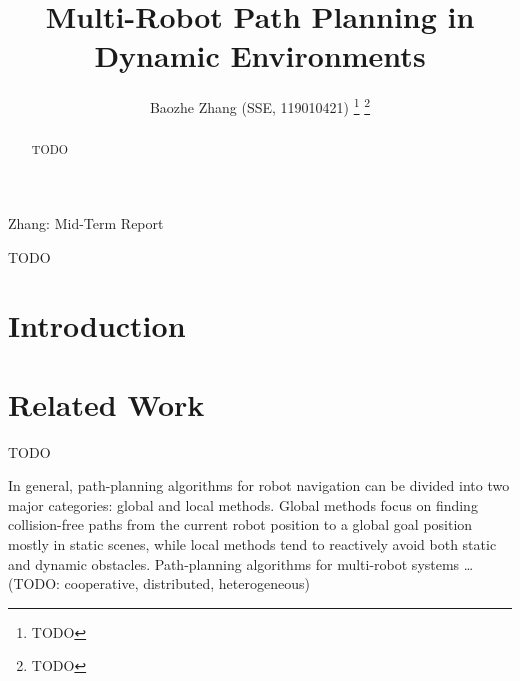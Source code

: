 \documentclass[letterpaper,journal]{IEEEtran}
\begin{document}
\title{Multi-Robot Path Planning in Dynamic Environments}

\author{Baozhe Zhang (SSE, 119010421)
\thanks{TODO}%
\thanks{TODO}}

%
{Zhang: Mid-Term Report}


\maketitle

\begin{abstract}
TODO
\end{abstract}

\begin{IEEEkeywords}
  TODO
\end{IEEEkeywords}

\section{Introduction}

\section{Related Work}
TODO \cite{Falanga_pampc}

In general, path-planning algorithms for robot navigation can be divided into two major categories: global and local methods.
Global methods focus on finding collision-free paths from the current robot position to a global goal position mostly in static scenes, while local methods tend to reactively avoid both static and dynamic obstacles. 
Path-planning algorithms for multi-robot systems \dots (TODO: cooperative, distributed, heterogeneous)



\end{document}
